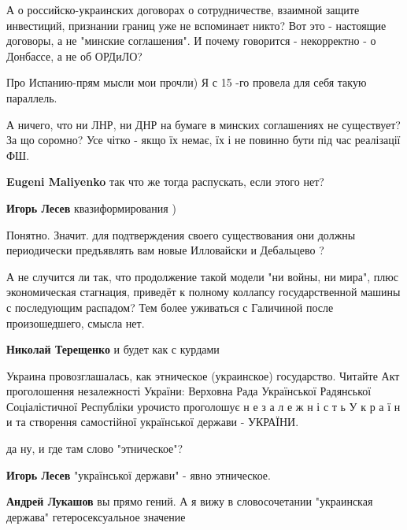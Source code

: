 \begin{itemize}

А о российско-украинских договорах о сотрудничестве, взаимной защите
инвестиций, признании границ уже не вспоминает никто? Вот это - настоящие
договоры, а не "минские соглашения". И почему говорится - некорректно - о
Донбассе, а не об ОРДиЛО?


Про Испанию-прям мысли мои прочли) Я с 15 -го провела для себя такую параллель.


А ничего, что ни ЛНР, ни ДНР на бумаге в минских соглашениях не существует? За
що соромно? Усе чітко - якщо їх немає, їх і не повинно бути під час реалізації
ФШ.

\begin{itemize} %
\textbf{Eugeni Maliyenko} так что же тогда распускать, если этого нет?

\textbf{Игорь Лесев} квазиформирования )

Понятно. Значит. для подтверждения своего существования они должны периодически предъявлять вам новые Илловайски и Дебальцево ?
\end{itemize} %


А не случится ли так, что продолжение такой модели "ни войны, ни мира", плюс
экономическая стагнация, приведёт к полному коллапсу государственной машины с
последующим распадом? Тем более уживаться с Галичиной после произошедшего,
смысла нет.

\begin{itemize} %
\textbf{Николай Терещенко} и будет как с курдами
\end{itemize} %


Украина провозглашалась, как этническое (украинское) государство. Читайте Акт проголошення незалежності України:
Верховна Рада Української Радянської Соціалістичної Республіки урочисто проголошує
н е з а л е ж н і с т ь У к р а ї н и та створення самостійної української держави - УКРАЇНИ.

\begin{itemize} %
да ну, и где там слово "этническое"?

\textbf{Игорь Лесев} "української держави" - явно этническое.

\textbf{Андрей Лукашов} вы прямо гений. А я вижу в словосочетании "украинская держава" гетеросексуальное значение


\end{itemize}
\end{itemize}
